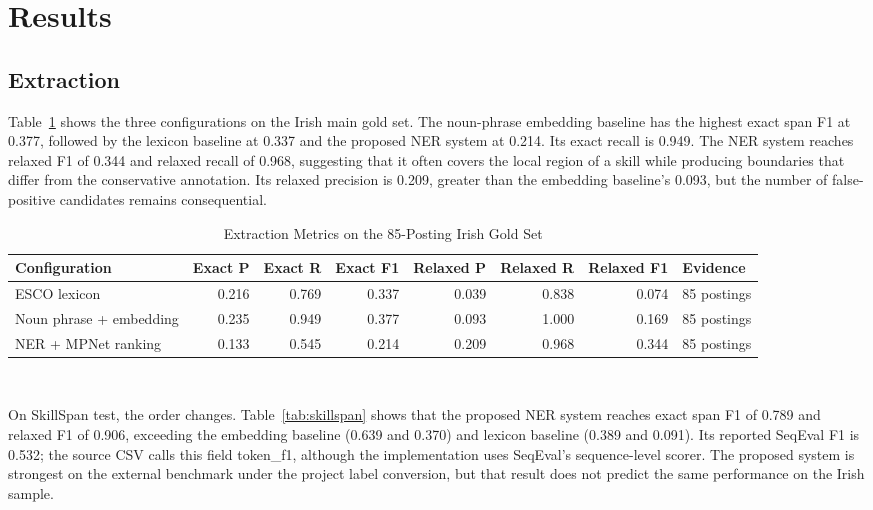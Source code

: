 \documentclass[conference]{IEEEtran}
\begin{document}
\section{Results}
\subsection{Extraction}
Table~\ref{tab:irish-extraction} shows the three configurations on the Irish main gold set. The noun-phrase embedding baseline has the highest exact span F1 at 0.377, followed by the lexicon baseline at 0.337 and the proposed NER system at 0.214. Its exact recall is 0.949. The NER system reaches relaxed F1 of 0.344 and relaxed recall of 0.968, suggesting that it often covers the local region of a skill while producing boundaries that differ from the conservative annotation. Its relaxed precision is 0.209, greater than the embedding baseline's 0.093, but the number of false-positive candidates remains consequential.

\begin{table}[!t]
\caption{Extraction Metrics on the 85-Posting Irish Gold Set}
\label{tab:irish-extraction}
\centering
\small
\begin{tabular}{lrrrrrrl}
\toprule
Configuration & Exact P & Exact R & Exact F1 & Relaxed P & Relaxed R & Relaxed F1 & Evidence \\
\midrule
ESCO lexicon & 0.216 & 0.769 & 0.337 & 0.039 & 0.838 & 0.074 & 85 postings \\
Noun phrase + embedding & 0.235 & 0.949 & 0.377 & 0.093 & 1.000 & 0.169 & 85 postings \\
NER + MPNet ranking & 0.133 & 0.545 & 0.214 & 0.209 & 0.968 & 0.344 & 85 postings \\
\bottomrule
\end{tabular}
\\[1mm]
\par{}
\end{table}

On SkillSpan test, the order changes. Table~\ref{tab:skillspan} shows that the proposed NER system reaches exact span F1 of 0.789 and relaxed F1 of 0.906, exceeding the embedding baseline (0.639 and 0.370) and lexicon baseline (0.389 and 0.091). Its reported SeqEval F1 is 0.532; the source CSV calls this field \textsf{token\_f1}, although the implementation uses SeqEval's sequence-level scorer. The proposed system is strongest on the external benchmark under the project label conversion, but that result does not predict the same performance on the Irish sample.
\end{document}
